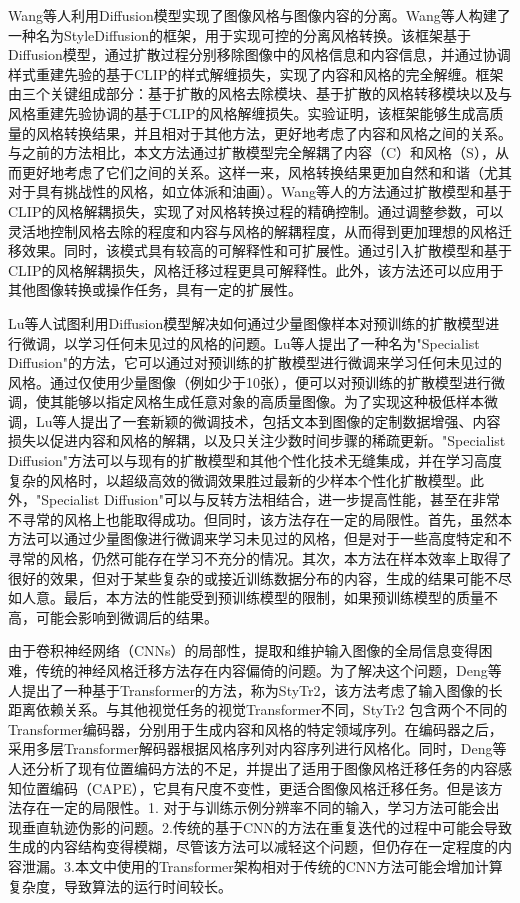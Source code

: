 Wang等人\cite{wangStyleDiffusionControllableDisentangled2023}利用Diffusion模型实现了图像风格与图像内容的分离。Wang等人构建了一种名为StyleDiffusion的框架，用于实现可控的分离风格转换。该框架基于Diffusion模型，通过扩散过程分别移除图像中的风格信息和内容信息，并通过协调样式重建先验的基于CLIP的样式解缠损失，实现了内容和风格的完全解缠。框架由三个关键组成部分：基于扩散的风格去除模块、基于扩散的风格转移模块以及与风格重建先验协调的基于CLIP的风格解缠损失。实验证明，该框架能够生成高质量的风格转换结果，并且相对于其他方法，更好地考虑了内容和风格之间的关系。与之前的方法相比，本文方法通过扩散模型完全解耦了内容（C）和风格（S），从而更好地考虑了它们之间的关系。这样一来，风格转换结果更加自然和和谐（尤其对于具有挑战性的风格，如立体派和油画）。Wang等人的方法通过扩散模型和基于CLIP的风格解耦损失，实现了对风格转换过程的精确控制。通过调整参数，可以灵活地控制风格去除的程度和内容与风格的解耦程度，从而得到更加理想的风格迁移效果。同时，该模式具有较高的可解释性和可扩展性。通过引入扩散模型和基于CLIP的风格解耦损失，风格迁移过程更具可解释性。此外，该方法还可以应用于其他图像转换或操作任务，具有一定的扩展性。

Lu等人\cite{luSpecialistDiffusionPlugandPlay2023}试图利用Diffusion模型解决如何通过少量图像样本对预训练的扩散模型进行微调，以学习任何未见过的风格的问题。Lu等人提出了一种名为"Specialist Diffusion"的方法，它可以通过对预训练的扩散模型进行微调来学习任何未见过的风格。通过仅使用少量图像（例如少于10张），便可以对预训练的扩散模型进行微调，使其能够以指定风格生成任意对象的高质量图像。为了实现这种极低样本微调，Lu等人提出了一套新颖的微调技术，包括文本到图像的定制数据增强、内容损失以促进内容和风格的解耦，以及只关注少数时间步骤的稀疏更新。"Specialist Diffusion"方法可以与现有的扩散模型和其他个性化技术无缝集成，并在学习高度复杂的风格时，以超级高效的微调效果胜过最新的少样本个性化扩散模型。此外，"Specialist Diffusion"可以与反转方法相结合，进一步提高性能，甚至在非常不寻常的风格上也能取得成功。但同时，该方法存在一定的局限性。首先，虽然本方法可以通过少量图像进行微调来学习未见过的风格，但是对于一些高度特定和不寻常的风格，仍然可能存在学习不充分的情况。其次，本方法在样本效率上取得了很好的效果，但对于某些复杂的或接近训练数据分布的内容，生成的结果可能不尽如人意。最后，本方法的性能受到预训练模型的限制，如果预训练模型的质量不高，可能会影响到微调后的结果。

由于卷积神经网络（CNNs）的局部性，提取和维护输入图像的全局信息变得困难，传统的神经风格迁移方法存在内容偏倚的问题。为了解决这个问题，Deng等人\cite{dengStyTr2ImageStyle2022}提出了一种基于Transformer的方法，称为StyTr2，该方法考虑了输入图像的长距离依赖关系。与其他视觉任务的视觉Transformer不同，StyTr2 包含两个不同的Transformer编码器，分别用于生成内容和风格的特定领域序列。在编码器之后，采用多层Transformer解码器根据风格序列对内容序列进行风格化。同时，Deng等人还分析了现有位置编码方法的不足，并提出了适用于图像风格迁移任务的内容感知位置编码（CAPE），它具有尺度不变性，更适合图像风格迁移任务。但是该方法存在一定的局限性。1. 对于与训练示例分辨率不同的输入，学习方法可能会出现垂直轨迹伪影的问题。2.传统的基于CNN的方法在重复迭代的过程中可能会导致生成的内容结构变得模糊，尽管该方法可以减轻这个问题，但仍存在一定程度的内容泄漏。3.本文中使用的Transformer架构相对于传统的CNN方法可能会增加计算复杂度，导致算法的运行时间较长。